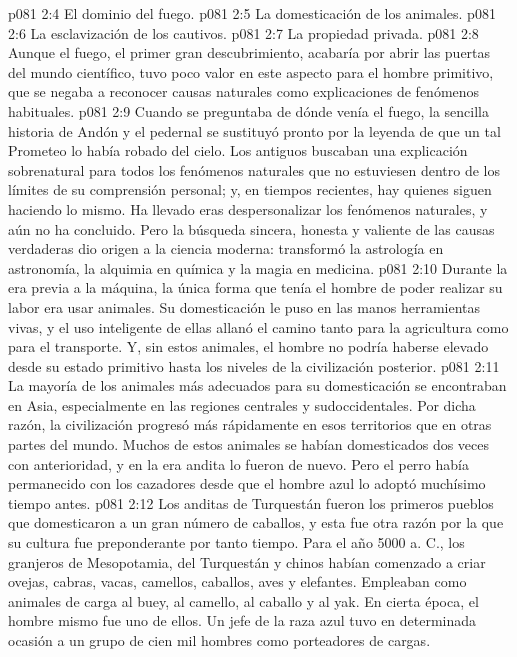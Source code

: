 \vs p081 2:4 El dominio del fuego.
\vs p081 2:5 La domesticación de los animales.
\vs p081 2:6 La esclavización de los cautivos.
\vs p081 2:7 La propiedad privada.
\vs p081 2:8 \pc Aunque el fuego, el primer gran descubrimiento, acabaría por abrir las puertas del mundo científico, tuvo poco valor en este aspecto para el hombre primitivo, que se negaba a reconocer causas naturales como explicaciones de fenómenos habituales.
\vs p081 2:9 Cuando se preguntaba de dónde venía el fuego, la sencilla historia de Andón y el pedernal se sustituyó pronto por la leyenda de que un tal Prometeo lo había robado del cielo. Los antiguos buscaban una explicación sobrenatural para todos los fenómenos naturales que no estuviesen dentro de los límites de su comprensión personal; y, en tiempos recientes, hay quienes siguen haciendo lo mismo. Ha llevado eras despersonalizar los fenómenos naturales, y aún no ha concluido. Pero la búsqueda sincera, honesta y valiente de las causas verdaderas dio origen a la ciencia moderna: transformó la astrología en astronomía, la alquimia en química y la magia en medicina.
\vs p081 2:10 \pc Durante la era previa a la máquina, la única forma que tenía el hombre de poder realizar su labor era usar animales. Su domesticación le puso en las manos herramientas vivas, y el uso inteligente de ellas allanó el camino tanto para la agricultura como para el transporte. Y, sin estos animales, el hombre no podría haberse elevado desde su estado primitivo hasta los niveles de la civilización posterior.
\vs p081 2:11 La mayoría de los animales más adecuados para su domesticación se encontraban en Asia, especialmente en las regiones centrales y sudoccidentales. Por dicha razón, la civilización progresó más rápidamente en esos territorios que en otras partes del mundo. Muchos de estos animales se habían domesticados dos veces con anterioridad, y en la era andita lo fueron de nuevo. Pero el perro había permanecido con los cazadores desde que el hombre azul lo adoptó muchísimo tiempo antes.
\vs p081 2:12 Los anditas de Turquestán fueron los primeros pueblos que domesticaron a un gran número de caballos, y esta fue otra razón por la que su cultura fue preponderante por tanto tiempo. Para el año 5000 a. C., los granjeros de Mesopotamia, del Turquestán y chinos habían comenzado a criar ovejas, cabras, vacas, camellos, caballos, aves y elefantes. Empleaban como animales de carga al buey, al camello, al caballo y al yak. En cierta época, el hombre mismo fue uno de ellos. Un jefe de la raza azul tuvo en determinada ocasión a un grupo de cien mil hombres como porteadores de cargas.
